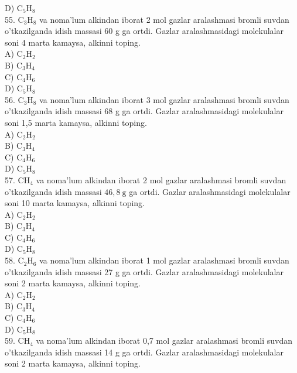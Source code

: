 D) $\mathrm{C}_{5} \mathrm{H}_{8}$\\
55. $\mathrm{C}_{3} \mathrm{H}_{8}$ va noma'lum alkindan iborat 2 mol gazlar aralashmasi bromli suvdan o'tkazilganda idish massasi 60 g ga ortdi. Gazlar aralashmasidagi molekulalar soni 4 marta kamaysa, alkinni toping.\\
A) $\mathrm{C}_{2} \mathrm{H}_{2}$\\
B) $\mathrm{C}_{3} \mathrm{H}_{4}$\\
C) $\mathrm{C}_{4} \mathrm{H}_{6}$\\
D) $\mathrm{C}_{5} \mathrm{H}_{8}$\\
56. $\mathrm{C}_{3} \mathrm{H}_{8}$ va noma'lum alkindan iborat 3 mol gazlar aralashmasi bromli suvdan o'tkazilganda idish massasi 68 g ga ortdi. Gazlar aralashmasidagi molekulalar soni 1,5 marta kamaysa, alkinni toping.\\
A) $\mathrm{C}_{2} \mathrm{H}_{2}$\\
B) $\mathrm{C}_{3} \mathrm{H}_{4}$\\
C) $\mathrm{C}_{4} \mathrm{H}_{6}$\\
D) $\mathrm{C}_{5} \mathrm{H}_{8}$\\
57. $\mathrm{CH}_{4}$ va noma'lum alkindan iborat 2 mol gazlar aralashmasi bromli suvdan o'tkazilganda idish massasi $46,8 \mathrm{~g}$ ga ortdi. Gazlar aralashmasidagi molekulalar soni 10 marta kamaysa, alkinni toping.\\
A) $\mathrm{C}_{2} \mathrm{H}_{2}$\\
B) $\mathrm{C}_{3} \mathrm{H}_{4}$\\
C) $\mathrm{C}_{4} \mathrm{H}_{6}$\\
D) $\mathrm{C}_{5} \mathrm{H}_{8}$\\
58. $\mathrm{C}_{2} \mathrm{H}_{6}$ va noma'lum alkindan iborat 1 mol gazlar aralashmasi bromli suvdan o'tkazilganda idish massasi 27 g ga ortdi. Gazlar aralashmasidagi molekulalar soni 2 marta kamaysa, alkinni toping.\\
A) $\mathrm{C}_{2} \mathrm{H}_{2}$\\
B) $\mathrm{C}_{3} \mathrm{H}_{4}$\\
C) $\mathrm{C}_{4} \mathrm{H}_{6}$\\
D) $\mathrm{C}_{5} \mathrm{H}_{8}$\\
59. $\mathrm{CH}_{4}$ va noma'lum alkindan iborat 0,7 mol gazlar aralashmasi bromli suvdan o'tkazilganda idish massasi 14 g ga ortdi. Gazlar aralashmasidagi molekulalar soni 2 marta kamaysa, alkinni toping.\\
